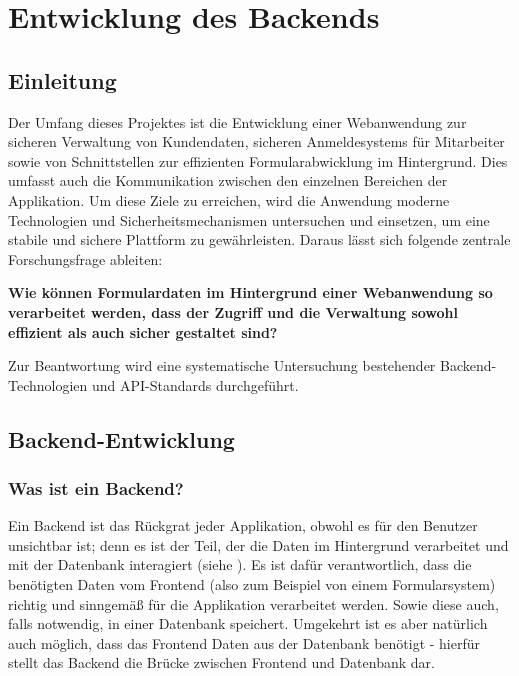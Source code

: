 \section{Entwicklung des Backends}

\subsection{Einleitung}

Der Umfang dieses Projektes ist die Entwicklung einer Webanwendung zur sicheren Verwaltung von Kundendaten, sicheren Anmeldesystems für Mitarbeiter sowie von Schnittstellen zur effizienten Formularabwicklung im Hintergrund. Dies umfasst auch die Kommunikation zwischen den einzelnen Bereichen der Applikation. Um diese Ziele zu erreichen, wird die Anwendung moderne Technologien und Sicherheitsmechanismen untersuchen und einsetzen, um eine stabile und sichere Plattform zu gewährleisten.
Daraus lässt sich folgende zentrale Forschungsfrage ableiten:
\newline

\begin{center}
    
\textbf{Wie können Formulardaten im Hintergrund einer Webanwendung so verarbeitet werden, dass der Zugriff und die Verwaltung sowohl effizient als auch sicher gestaltet sind?}
\end{center}

Zur Beantwortung wird eine systematische Untersuchung bestehender Backend-Technologien und API-Standards durchgeführt.

\subsection{Backend-Entwicklung}

\subsubsection{Was ist ein Backend?}
Ein Backend ist das Rückgrat jeder Applikation, obwohl es für den Benutzer unsichtbar ist; denn es ist der Teil, der die Daten im Hintergrund verarbeitet und mit der Datenbank interagiert (siehe \cite{wiki-backend}). Es ist dafür verantwortlich, dass die benötigten Daten vom Frontend (also zum Beispiel von einem Formularsystem) richtig und sinngemäß für die Applikation verarbeitet werden. Sowie diese auch, falls notwendig, in einer Datenbank speichert. Umgekehrt ist es aber natürlich auch möglich, dass das Frontend Daten aus der Datenbank benötigt - hierfür stellt das Backend die Brücke zwischen Frontend und Datenbank dar.


